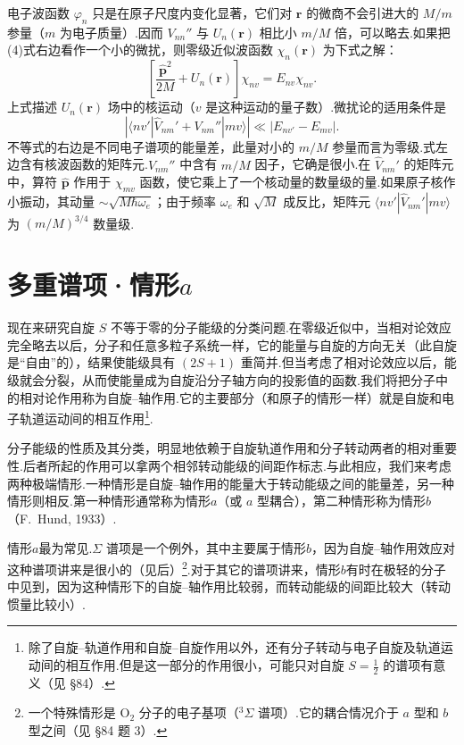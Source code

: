 \begin{xiti}
电子波函数 $\varphi_n$ 只是在原子尺度内变化显著，它们对 $\boldsymbol{r}$ 的微商不会引进大的 $M/m$ 参量（$m$ 为电子质量）.因而 $V_{nn}''$ 与 $U_n(\boldsymbol{r})$ 相比小 $m/M$ 倍，可以略去.如果把(4)式右边看作一个小的微扰，则零级近似波函数 $\chi_n(\boldsymbol{r})$ 为下式之解：
\begin{equation}
  \left[\frac{\hat{\boldsymbol{p}}^2}{2M}+U_n(\boldsymbol{r})\right]\chi_{nv}=E_{nv}\chi_{nv}.
\end{equation}
上式描述 $U_n(\boldsymbol{r})$ 场中的核运动（$v$ 是这种运动的量子数）.微扰论的适用条件是
\begin{equation*}
  \left|\langle nv'|\hat{V}_{nm}'+V_{nm}''|mv\rangle\right|
  \ll\left|E_{nv'}-E_{mv}\right|.
\end{equation*}
不等式的右边是不同电子谱项的能量差，此量对小的 $m/M$ 参量而言为零级.式左边含有核波函数的矩阵元.$V_{nm}''$ 中含有 $m/M$ 因子，它确是很小.在 $\hat{V}_{nm}'$ 的矩阵元中，算符 $\hat{\boldsymbol{p}}$ 作用于 $\chi_{mv}$ 函数，使它乘上了一个核动量的数量级的量.如果原子核作小振动，其动量 $\sim\sqrt{M\hbar\omega_e}$；由于频率 $\omega_e$ 和 $\sqrt{M}$ 成反比，矩阵元 $\langle nv'|\hat{V}_{nm}'|mv\rangle$ 为 $(m/M)^{3/4}$ 数量级.

\end{xiti}
\renewcommand{\theequation}{\arabic{section}.\arabic{equation}}%

\section{多重谱项·情形\texorpdfstring{$a$}{a}}

现在来研究自旋 $S$ 不等于零的分子能级的分类问题.在零级近似中，当相对论效应完全略去以后，分子和任意多粒子系统一样，它的能量与自旋的方向无关（此自旋是“自由”的），结果使能级具有 $(2S+1)$ 重简并.但当考虑了相对论效应以后，能级就会分裂，从而使能量成为自旋沿分子轴方向的投影值的函数.我们将把分子中的相对论作用称为自旋–轴作用.它的主要部分（和原子的情形一样）就是自旋和电子轨道运动间的相互作用\footnote{除了自旋–轨道作用和自旋–自旋作用以外，还有分子转动与电子自旋及轨道运动间的相互作用.但是这一部分的作用很小，可能只对自旋 $S=\frac{1}{2}$ 的谱项有意义（见 §84）.}.

分子能级的性质及其分类，明显地依赖于自旋轨道作用和分子转动两者的相对重要性.后者所起的作用可以拿两个相邻转动能级的间距作标志.与此相应，我们来考虑两种极端情形.一种情形是自旋–轴作用的能量大于转动能级之间的能量差，另一种情形则相反.第一种情形通常称为情形$a$（或 $a$ 型耦合），第二种情形称为情形$b$（F.~Hund, 1933）.

情形$a$最为常见.$\Sigma$ 谱项是一个例外，其中主要属于情形$b$，因为自旋–轴作用效应对这种谱项讲来是很小的（见后）\footnote{一个特殊情形是 $\mathrm{O}_2$ 分子的电子基项（$^3\Sigma$ 谱项）.它的耦合情况介于 $a$ 型和 $b$ 型之间（见 §84 题 3）.}.对于其它的谱项讲来，情形$b$有时在极轻的分子中见到，因为这种情形下的自旋–轴作用比较弱，而转动能级的间距比较大（转动惯量比较小）.

